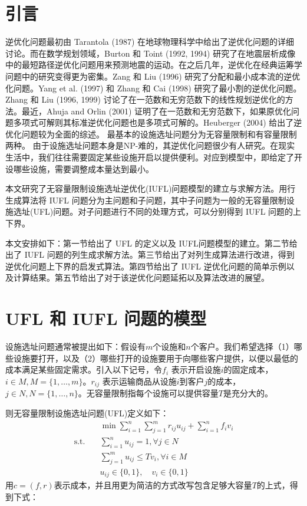 \documentclass[UTF8]{article}
\begin{document}
\section{引言}

逆优化问题最初由 Tarantola (1987) 在地球物理科学中给出了逆优化问题的详细讨论。而在数学规划领域，Burton 和 Toint (1992, 1994) 研究了在地震层析成像中的最短路径逆优化问题用来预测地震的运动。在之后几年，逆优化在经典运筹学问题中的研究变得更为密集。Zang 和 Liu (1996) 研究了分配和最小成本流的逆优化问题。Yang et al. (1997) 和 Zhang 和 Cai (1998) 研究了最小割的逆优化问题。Zhang 和 Liu (1996, 1999) 讨论了在一范数和无穷范数下的线性规划逆优化的方法。最近，Ahuja and Orlin (2001) 证明了在一范数和无穷范数下，如果原优化问题多项式可解则其标准逆优化问题也是多项式可解的。Heuberger (2004) 给出了逆优化问题较为全面的综述。
最基本的设施选址问题分为无容量限制和有容量限制两种。
由于设施选址问题本身是NP-难的，其逆优化问题很少有人研究。在现实生活中，我们往往需要固定某些设施开启以提供便利。对应到模型中，即给定了开设哪些设施，需要调整成本量达到最小。

本文研究了无容量限制设施选址逆优化(IUFL)问题模型的建立与求解方法。用行生成算法将 IUFL 问题分为主问题和子问题，其中子问题为一般的无容量限制设施选址(UFL)问题。对子问题进行不同的处理方式，可以分别得到 IUFL 问题的上下界。

本文安排如下：第一节给出了 UFL 的定义以及 IUFL问题模型的建立。第二节给出了 IUFL 问题的列生成求解方法。第三节给出了对列生成算法进行改进，得到逆优化问题上下界的启发式算法。第四节给出了 IUFL 逆优化问题的简单示例以及计算结果。第五节给出了对于该逆优化问题延拓以及算法改进的展望。

\section{ UFL 和 IUFL 问题的模型}

设施选址问题通常被提出如下：假设有$m$个设施和$n$个客户。我们希望选择（1）哪些设施要打开，以及（2）哪些打开的设施要用于向哪些客户提供，以便以最低的成本满足某些固定需求。引入以下记号，令$f_i$ 表示开启设施$i$的固定成本，$i \in M, M=\{1,\ldots,m\}$。$r_{ij}$ 表示运输商品从设施$i$到客户$j$的成本，$j \in N, N=\{1,\ldots,n\}$。无容量限制指每个设施可以提供容量$T$是充分大的。

则无容量限制设施选址问题(UFL)定义如下：
\begin{align*}
&\min \sum_{i=1}^n \sum_{j=1}^m r_{ij}u_{ij} + \sum_{i=1}^n f_i v_i \\
\text{s.t.}\quad & \sum_{i=1}^n u_{ij} =1, \forall j \in N  \\
&\sum_{j=1}^m u_{ij}  \leq Tv_i, \forall i \in M \\
& u_{ij} \in \{0,1\}, \quad v_{i} \in \{0,1\}
\end{align*}
用$c=(f,r)$表示成本，并且用更为简洁的方式改写包含足够大容量$T$的上式，得到下式：
\end{document}
